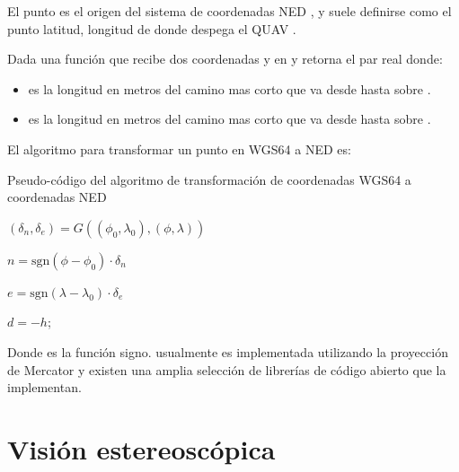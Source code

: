 El punto  es el origen del sistema de coordenadas NED \cite{cai2011coordinate}, y suele definirse como el punto latitud, longitud de donde despega el QUAV \cite{multidrone2017review}.

Dada  una función que recibe dos coordenadas  y  en  y retorna el par real  donde: 

\begin{itemize}
    \item {} es la longitud en metros del camino mas corto que va desde  hasta  sobre .
    \item {} es la longitud en metros del camino mas corto que va desde  hasta  sobre .
\end{itemize}

El algoritmo para transformar un punto  en WGS64 a NED es:

\begin{algorithm}
\caption{Pseudo-código del algoritmo de transformación de coordenadas WGS64 a coordenadas NED}
\label{alg:NED}

$(\delta_n, \delta_e) = G((\phi_0, \lambda_0), (\phi, \lambda))$

$n = \text{sgn}(\phi - \phi_0) \cdot \delta_n$

$e = \text{sgn}(\lambda - \lambda_0) \cdot \delta_e$

$d = -h$;


\end{algorithm}


Donde  es la función signo.  usualmente es implementada utilizando la proyección de Mercator \cite{vis2018history} y existen una amplia selección de librerías de código abierto que la implementan.

\section{Visión estereoscópica}
\label{sec:teo-stereo}

